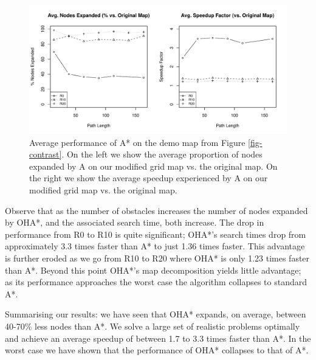 \begin{figure}[htbp]
	\begin{center}
		       \includegraphics[width=0.9\columnwidth, trim = 20mm 17mm 20mm 5mm]{diagrams/csc2f_performance.pdf}
	\end{center}
	\caption{Average performance of A* on the demo map from Figure \ref{fig-contrast}. On the left
	we show the average proportion of nodes expanded by A\* on our modified grid map vs. the original map.
	On the right we show the average speedup experienced by A\* on our modified grid map vs. the original map. 
	}
\label{fig-csc2fresults}
\end{figure}


Observe that as the number of obstacles increases the number of nodes expanded by OHA*, and the
associated search time, both increase. 
The drop in performance from R0 to R10 is quite significant; OHA*'s search times drop
from approximately 3.3 times faster than A* to just 1.36 times faster.
This advantage is further eroded as we go from R10 to R20 where OHA* is only 
1.23 times faster than A*.
Beyond this point OHA*'s map decomposition yields little advantage; 
as its performance approaches the worst case the algorithm collapses
to standard A*.
\par
Summarising our results: we have seen that OHA* expands, on average, between 40-70\% less nodes than A*.
We solve a large set of realistic problems optimally and achieve an average speedup of between 1.7 to 
3.3 times faster than A*.
In the worst case we have shown that the performance of OHA* collapses to that of A*.
